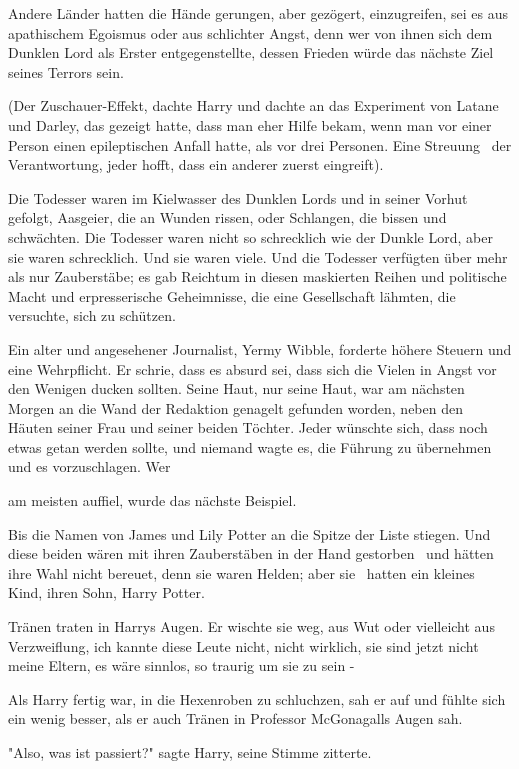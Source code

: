 {Andere Länder hatten die Hände gerungen, aber gezögert, einzugreifen, sei es aus apathischem Egoismus oder aus schlichter Angst, denn wer von ihnen sich dem Dunklen Lord als Erster entgegenstellte, dessen Frieden würde das nächste Ziel seines Terrors sein.

(Der Zuschauer-Effekt, dachte Harry und dachte an das Experiment von Latane und Darley, das gezeigt hatte, dass man eher Hilfe bekam, wenn man vor einer Person einen epileptischen Anfall hatte, als vor drei Personen. Eine Streuung ~der Verantwortung, jeder hofft, dass ein anderer zuerst eingreift).

Die Todesser waren im Kielwasser des Dunklen Lords und in seiner Vorhut gefolgt, Aasgeier, die an Wunden rissen, oder Schlangen, die bissen und schwächten. Die Todesser waren nicht so schrecklich wie der Dunkle Lord, aber sie waren schrecklich. Und sie waren viele. Und die Todesser verfügten über mehr als nur Zauberstäbe; es gab Reichtum in diesen maskierten Reihen und politische Macht und erpresserische Geheimnisse, die eine Gesellschaft lähmten, die versuchte, sich zu schützen.

Ein alter und angesehener Journalist, Yermy Wibble, forderte höhere Steuern und eine Wehrpflicht. Er schrie, dass es absurd sei, dass sich die Vielen in Angst vor den Wenigen ducken sollten. Seine Haut, nur seine Haut, war am nächsten Morgen an die Wand der Redaktion genagelt gefunden worden, neben den Häuten seiner Frau und seiner beiden Töchter. Jeder wünschte sich, dass noch etwas getan werden sollte, und niemand wagte es, die Führung zu übernehmen und es vorzuschlagen. Wer

am meisten auffiel, wurde das nächste Beispiel.

Bis die Namen von James und Lily Potter an die Spitze der Liste stiegen. Und diese beiden wären mit ihren Zauberstäben in der Hand gestorben ~und hätten ihre Wahl nicht bereuet, denn sie waren Helden; aber sie ~hatten ein kleines Kind, ihren Sohn, Harry Potter.

Tränen traten in Harrys Augen. Er wischte sie weg, aus Wut oder vielleicht aus Verzweiflung, ich kannte diese Leute nicht, nicht wirklich, sie sind jetzt nicht meine Eltern, es wäre sinnlos, so traurig um sie zu sein -

Als Harry fertig war, in die Hexenroben zu schluchzen, sah er auf und fühlte sich ein wenig besser, als er auch Tränen in Professor McGonagalls Augen sah.

"Also, was ist passiert?" sagte Harry, seine Stimme zitterte.

}
